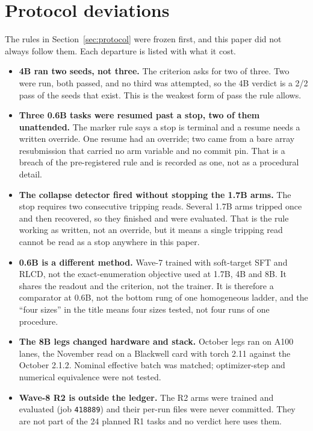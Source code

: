 \documentclass[11pt]{article}
\begin{document}
\section{Protocol deviations}\label{sec:deviations}

The rules in Section~\ref{sec:protocol} were frozen first, and this paper did not always follow them.
Each departure is listed with what it cost.

\begin{itemize}
  \item \textbf{4B ran two seeds, not three.} The criterion asks for two of three. Two were run, both
  passed, and no third was attempted, so the 4B verdict is a 2/2 pass of the seeds that exist. This is
  the weakest form of pass the rule allows.
  \item \textbf{Three 0.6B tasks were resumed past a stop, two of them unattended.} The marker rule says
  a stop is terminal and a resume needs a written override. One resume had an override; two came from a
  bare array resubmission that carried no arm variable and no commit pin. That is a breach of the
  pre-registered rule and is recorded as one, not as a procedural detail.
  \item \textbf{The collapse detector fired without stopping the 1.7B arms.} The stop requires two
  consecutive tripping reads. Several 1.7B arms tripped once and then recovered, so they finished and
  were evaluated. That is the rule working as written, not an override, but it means a single tripping
  read cannot be read as a stop anywhere in this paper.
  \item \textbf{0.6B is a different method.} Wave-7 trained with soft-target SFT and RLCD, not the
  exact-enumeration objective used at 1.7B, 4B and 8B. It shares the readout and the criterion, not the
  trainer. It is therefore a comparator at 0.6B, not the bottom rung of one homogeneous ladder, and the
  ``four sizes'' in the title means four sizes tested, not four runs of one procedure.
  \item \textbf{The 8B legs changed hardware and stack.} October legs ran on A100 lanes, the November
  read on a Blackwell card with torch 2.11 against the October 2.1.2. Nominal effective batch was
  matched; optimizer-step and numerical equivalence were not tested.
  \item \textbf{Wave-8 R2 is outside the ledger.} The R2 arms were trained and evaluated (job
  \texttt{418889}) and their per-run files were never committed. They are not part of the 24 planned
  R1 tasks and no verdict here uses them.
\end{itemize}
\end{document}
